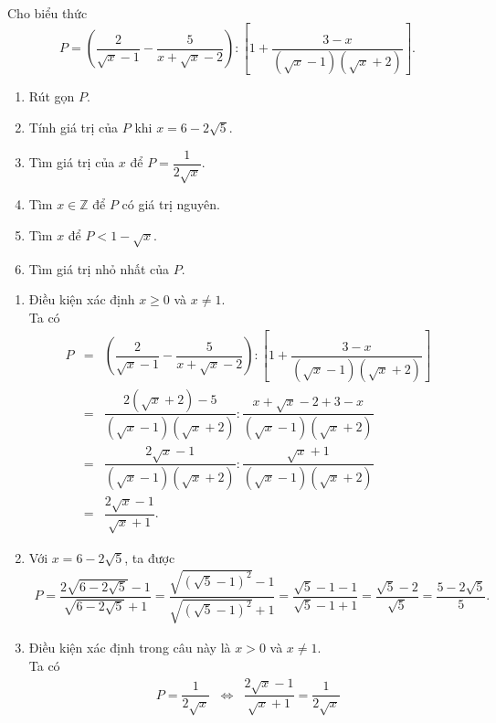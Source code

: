 \begin{bt}%
	Cho biểu thức
	$$P=\left(\dfrac{2}{\sqrt{x}-1}-\dfrac{5}{x+\sqrt{x}-2}\right): \left[1+\dfrac{3-x}{\left(\sqrt{x}-1\right)\left(\sqrt{x}+2\right)}\right].$$
	\begin{enumerate}
		\item Rút gọn $P$.
		\item Tính giá trị của $P$ khi $x=6-2\sqrt{5}$.
		\item Tìm giá trị của $x$ để $P=\dfrac{1}{2\sqrt{x}}$.
		\item Tìm $x \in \mathbb{Z}$ để $P$ có giá trị nguyên.
		\item Tìm $x$ để $P<1-\sqrt{x}$.
		\item Tìm giá trị nhỏ nhất của $P$.
	\end{enumerate}
	\loigiai
	{
		\begin{enumerate}
			\item Điều kiện xác định $x \geq 0$ và $x \neq 1$.\\
			Ta có
			\allowdisplaybreaks
			\begin{eqnarray*}
				P &=& \left(\dfrac{2}{\sqrt{x}-1}-\dfrac{5}{x+\sqrt{x}-2}\right): \left[1+\dfrac{3-x}{\left(\sqrt{x}-1\right)\left(\sqrt{x}+2\right)}\right] \\
				&=& \dfrac{2\left(\sqrt{x}+2\right)-5}{\left(\sqrt{x}-1\right)\left(\sqrt{x}+2\right)} : \dfrac{x+\sqrt{x}-2+3-x}{\left(\sqrt{x}-1\right)\left(\sqrt{x}+2\right)}\\
				&=& \dfrac{2\sqrt{x}-1}{\left(\sqrt{x}-1\right)\left(\sqrt{x}+2\right)} : \dfrac{\sqrt{x}+1}{\left(\sqrt{x}-1\right)\left(\sqrt{x}+2\right)}\\
				&=& \dfrac{2\sqrt{x}-1}{\sqrt{x}+1}.
			\end{eqnarray*}
			\item Với $x=6-2\sqrt{5}$, ta được
			\allowdisplaybreaks
			\begin{eqnarray*}
				P = \dfrac{2\sqrt{6-2\sqrt{5}}-1}{\sqrt{6-2\sqrt{5}}+1} = \dfrac{\sqrt{\left(\sqrt{5}-1\right)^2}-1}{\sqrt{\left(\sqrt{5}-1\right)^2}+1} = \dfrac{\sqrt{5}-1-1}{\sqrt{5}-1+1} = \dfrac{\sqrt{5}-2}{\sqrt{5}} = \dfrac{5-2\sqrt{5}}{5}.
			\end{eqnarray*}
			\item Điều kiện xác định trong câu này là $x>0$ và $x \neq 1$.\\
			Ta có
			\allowdisplaybreaks
			\begin{eqnarray*}
				P = \dfrac{1}{2\sqrt{x}} &\Leftrightarrow & \dfrac{2\sqrt{x}-1}{\sqrt{x}+1} = \dfrac{1}{2\sqrt{x}}\\

\end{eqnarray*}
\end{enumerate}}
\end{bt}
